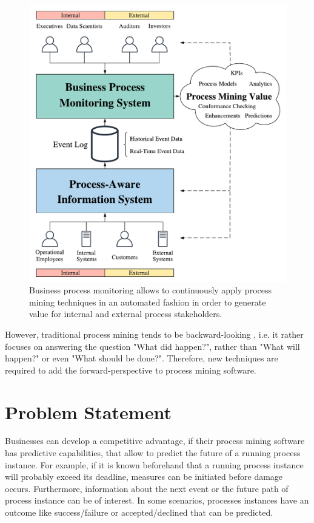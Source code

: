 \begin{figure}[htbp!]
	\centering
	\includegraphics[width=\textwidth]{figures/process-monitoring}
	\caption{Business process monitoring allows to continuously apply process mining techniques in an automated fashion in order to generate value for internal and external process stakeholders.}
	\label{fig:process-monitoring}
\end{figure}

However, traditional process mining tends to be backward-looking \cite{DBLP:conf/scsc/Aalst18}, i.e. it rather focuses on answering the question "What did happen?", rather than "What will happen?" or even "What should be done?".
Therefore, new techniques are required to add the forward-perspective to process mining software.

\section{Problem Statement}

Businesses can develop a competitive advantage, if their process mining software has predictive capabilities, that allow to predict the future of a running process instance.
For example, if it is known beforehand that a running process instance will probably exceed its deadline, measures can be initiated before damage occurs.
Furthermore, information about the next event or the future path of process instance can be of interest.
In some scenarios, processes instances have an outcome like success/failure or accepted/declined that can be predicted.

